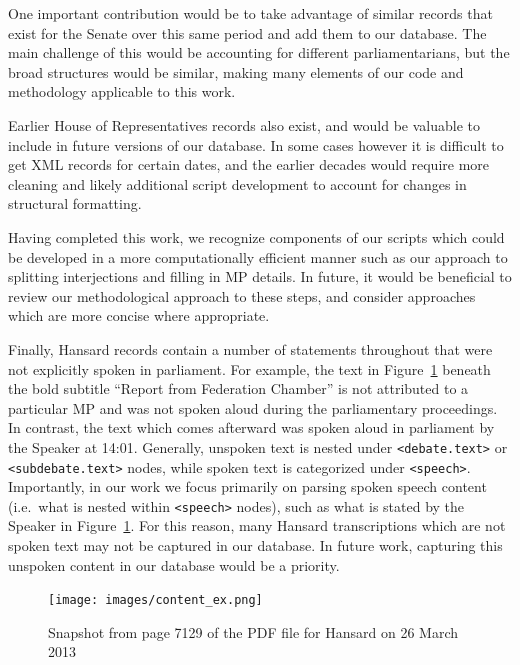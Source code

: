 \documentclass[
  letterpaper,
  DIV=11,
  numbers=noendperiod]{scrartcl}
\begin{document}
One important contribution would be to take advantage of similar records
that exist for the Senate over this same period and add them to our
database. The main challenge of this would be accounting for different
parliamentarians, but the broad structures would be similar, making many
elements of our code and methodology applicable to this work.

Earlier House of Representatives records also exist, and would be
valuable to include in future versions of our database. In some cases
however it is difficult to get XML records for certain dates, and the
earlier decades would require more cleaning and likely additional script
development to account for changes in structural formatting.

Having completed this work, we recognize components of our scripts which
could be developed in a more computationally efficient manner such as
our approach to splitting interjections and filling in MP details. In
future, it would be beneficial to review our methodological approach to
these steps, and consider approaches which are more concise where
appropriate.

Finally, Hansard records contain a number of statements throughout that
were not explicitly spoken in parliament. For example, the text in
Figure~\ref{fig-content_ex} beneath the bold subtitle ``Report from
Federation Chamber'' is not attributed to a particular MP and was not
spoken aloud during the parliamentary proceedings. In contrast, the text
which comes afterward was spoken aloud in parliament by the Speaker at
14:01. Generally, unspoken text is nested under
\texttt{\textless{}debate.text\textgreater{}} or
\texttt{\textless{}subdebate.text\textgreater{}} nodes, while spoken
text is categorized under \texttt{\textless{}speech\textgreater{}}.
Importantly, in our work we focus primarily on parsing spoken speech
content (i.e.~what is nested within
\texttt{\textless{}speech\textgreater{}} nodes), such as what is stated
by the Speaker in Figure~\ref{fig-content_ex}. For this reason, many
Hansard transcriptions which are not spoken text may not be captured in
our database. In future work, capturing this unspoken content in our
database would be a priority.

\begin{figure}

{\centering \texttt{[image: images/content\_ex.png]}

}

\caption{\label{fig-content_ex}Snapshot from page 7129 of the PDF file
for Hansard on 26 March 2013}

\end{figure}
\end{document}
